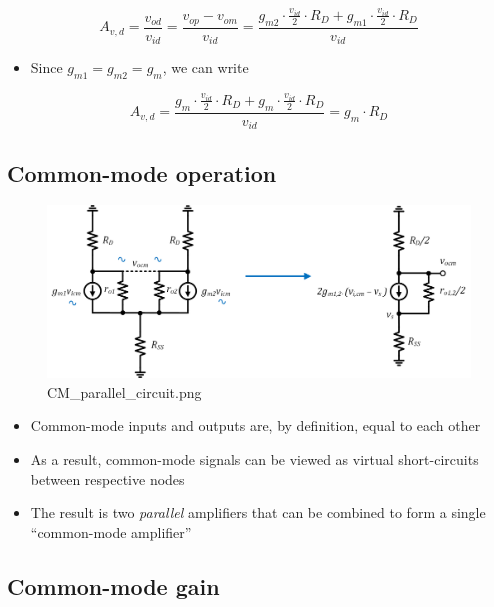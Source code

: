 \documentclass[11pt]{article}
\providecommand{\tightlist}{%
      \setlength{\itemsep}{0pt}\setlength{\parskip}{0pt}}
\begin{document}
\begin{equation}
A_{v,d} = \dfrac{v_{od}}{v_{id}} = \dfrac{v_{op} - v_{om}}{v_{id}} = \dfrac{g_{m2}\cdot \frac{v_{id}}{2}\cdot R_D + g_{m1}\cdot \frac{v_{id}}{2}\cdot R_D}{v_{id}}
\end{equation}

\begin{itemize}
\tightlist
\item
  Since \(g_{m1} = g_{m2} = g_m\), we can write
\end{itemize}

\begin{equation}
A_{v,d} = \dfrac{g_{m}\cdot \frac{v_{id}}{2}\cdot R_D + g_{m} \cdot \frac{v_{id}}{2}\cdot R_D}{v_{id}} = \boxed{g_m\cdot R_D}
\end{equation}

    \hypertarget{common-mode-operation}{%
\subsection{Common-mode operation}\label{common-mode-operation}}

    \begin{figure}
\centering
\includegraphics{CM_parallel_circuit.png}
\caption{CM\_parallel\_circuit.png}
\end{figure}

    \begin{itemize}
\tightlist
\item
  Common-mode inputs and outputs are, by definition, equal to each other
\item
  As a result, common-mode signals can be viewed as virtual
  short-circuits between respective nodes
\item
  The result is two \emph{parallel} amplifiers that can be combined to
  form a single ``common-mode amplifier''
\end{itemize}

    \hypertarget{common-mode-gain}{%
\subsection{Common-mode gain}\label{common-mode-gain}}
\end{document}
